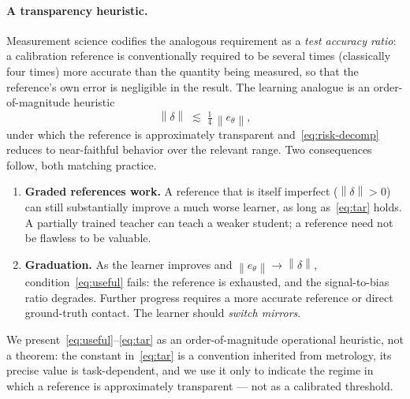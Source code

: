 \documentclass[10pt]{article} %
\theoremstyle{plain}
\theoremstyle{remark}
\newcommand{\norm}[1]{\left\lVert #1 \right\rVert}
\begin{document}
\paragraph{A transparency heuristic.} Measurement science codifies the analogous requirement as a \emph{test accuracy ratio}: a calibration reference is conventionally required to be several times (classically four times) more accurate than the quantity being measured, so that the reference's own error is negligible in the result. The learning analogue is an order-of-magnitude heuristic
\begin{equation}
\norm{\delta} \;\lesssim\; \tfrac{1}{4}\,\norm{e_\theta},
\label{eq:tar}
\end{equation}
under which the reference is approximately transparent and~\eqref{eq:risk-decomp} reduces to near-faithful behavior over the relevant range. Two consequences follow, both matching practice.

\begin{enumerate}[leftmargin=1.4em,itemsep=2pt,topsep=2pt]
\item \textbf{Graded references work.} A reference that is itself imperfect ($\norm{\delta}>0$) can still substantially improve a much worse learner, as long as~\eqref{eq:tar} holds. A partially trained teacher can teach a weaker student; a reference need not be flawless to be valuable.
\item \textbf{Graduation.} As the learner improves and $\norm{e_\theta}\to\norm{\delta}$, condition~\eqref{eq:useful} fails: the reference is exhausted, and the signal-to-bias ratio degrades. Further progress requires a more accurate reference or direct ground-truth contact. The learner should \emph{switch mirrors}.
\end{enumerate}

We present~\eqref{eq:useful}--\eqref{eq:tar} as an order-of-magnitude operational heuristic, not a theorem: the constant in~\eqref{eq:tar} is a convention inherited from metrology, its precise value is task-dependent, and we use it only to indicate the regime in which a reference is approximately transparent --- not as a calibrated threshold.
\end{document}
